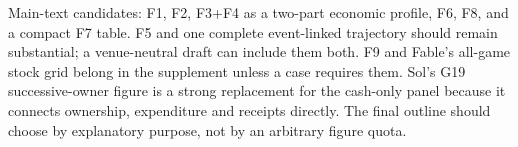 Main-text candidates: F1, F2, F3+F4 as a two-part economic profile, F6, F8, and a compact F7 table. F5 and one complete event-linked trajectory should remain substantial; a venue-neutral draft can include them both. F9 and Fable's all-game stock grid belong in the supplement unless a case requires them. Sol's G19 successive-owner figure is a strong replacement for the cash-only panel because it connects ownership, expenditure and receipts directly. The final outline should choose by explanatory purpose, not by an arbitrary figure quota.

